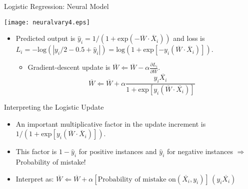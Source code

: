 \begin{frame}{Logistic Regression: Neural Model}
\begin{center}
\texttt{[image: neuralvary4.eps]}
\end{center}
\begin{itemize}
\item Predicted output is $\hat{y}_i=  1/(1 +\mbox{exp}(-\overline{W} \cdot
\overline{X}_i))$ and loss is $L_i= -\mbox{log}(|y_i/2 -0.5 +
\hat{y}_i
 |) = \mbox{log}(1+ \mbox{exp}[-y_i( \overline{W} \cdot \overline{X}_i)]) $.
 \begin{itemize}
\item  Gradient-descent update is $\overline{W} \Leftarrow
\overline{W} - \alpha \frac{\partial L_i}{\partial \overline{W}}$.
\begin{equation*}
\overline{W} \Leftarrow \overline{W}+ \alpha \frac{y_i
\overline{X_i}}{1 + \mbox{exp}[y_i (\overline{W}\cdot
\overline{X_i})]} \end{equation*}
\end{itemize}
\end{itemize}
\end{frame}


\begin{frame}{Interpreting the Logistic Update}
 \begin{itemize}
 \item An important multiplicative  factor in the update increment is $1/(1+
 \mbox{exp}[y_i(\overline{W}\cdot \overline{X}_i)])$.
 \item This factor is $1-\hat{y}_i$ for positive instances and
 $\hat{y}_i$ for negative instances $\Rightarrow$ Probability of
 mistake!
 \item Interpret as: $\overline{W} \Leftarrow \overline{W}+ \alpha \left[ \mbox{Probability of mistake on
$(\overline{X_i}, y_i)$} \right] \, (y_i \overline{X_i})$
\end{itemize}
\end{frame}


